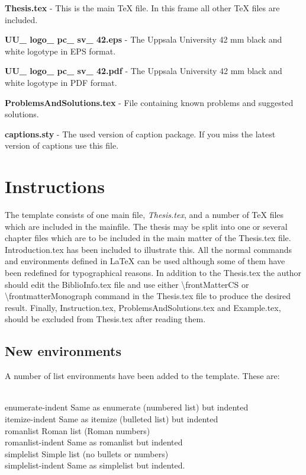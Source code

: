 \begin{simplelist}
    \item \textbf{Thesis.tex} - This is the main \TeX{} file. In this frame all other \TeX{} files are included.
    \item \textbf{UU\_ logo\_ pc\_ sv\_ 42.eps} - The Uppsala University 42 mm black and white logotype in EPS format.
    \item \textbf{UU\_ logo\_ pc\_ sv\_ 42.pdf} - The Uppsala University 42 mm black and white logotype in PDF format.
    \item \textbf{ProblemsAndSolutions.tex} - File containing known problems and suggested solutions.
    \item \textbf{captions.sty} - The used version of caption package. If you miss the latest version of captions use this file.
\end{simplelist}

\section{Instructions}
The template consists of one main file, \emph{Thesis.tex}, and a number of \TeX{} files which are included in the mainfile. The thesis may be split into one or several chapter files which are to be included in the main matter of the Thesis.tex file. Introduction.tex has been included to illustrate this. All the normal commands and environments defined in \LaTeX{} can be used although some of them have been redefined for typographical reasons. In addition to the Thesis.tex the author should edit the BiblioInfo.tex file and use either \textbackslash frontMatterCS or \textbackslash frontmatterMonograph command in the Thesis.tex file to produce the desired result. Finally, Instruction.tex, ProblemsAndSolutions.tex and Example.tex, should be excluded from Thesis.tex after reading them.

\subsection{New environments}
A number of list environments have been added to the template. These are:
\begin{tabbing}
\hspace{4cm}\=\\
enumerate-indent \> Same as enumerate (numbered list) but indented\\
itemize-indent \> Same as itemize (bulleted list) but indented\\
romanlist \> Roman list (Roman numbers)\\
romanlist-indent \> Same as romanlist but indented\\
simplelist \> Simple list (no bullets or numbers)\\
simplelist-indent \> Same as simplelist but indented.
\end{tabbing}

